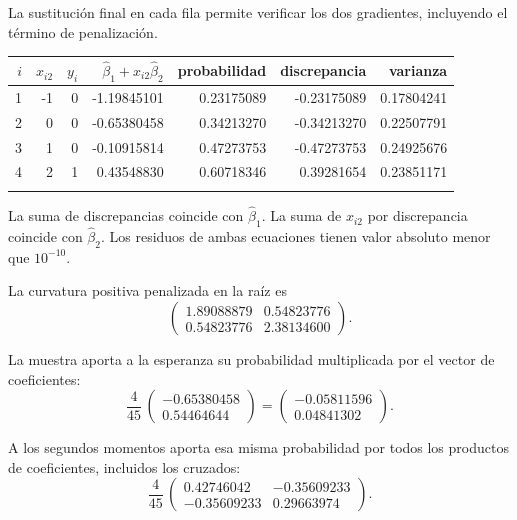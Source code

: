 \documentclass[11pt,a4paper]{article}
\begin{document}
La sustitución final en cada fila permite verificar
los dos gradientes, incluyendo el término de penalización.
\begin{center}\scriptsize
\begin{tabular}{rrrrrrr}\toprule
\(i\)&\(x_{i2}\)&\(y_i\)&\(\widehat\beta_1+x_{i2}\widehat\beta_2\)&probabilidad&discrepancia&varianza\\\midrule
1&-1&0&-1.19845101&0.23175089&-0.23175089&0.17804241\\
2&0&0&-0.65380458&0.34213270&-0.34213270&0.22507791\\
3&1&0&-0.10915814&0.47273753&-0.47273753&0.24925676\\
4&2&1&0.43548830&0.60718346&0.39281654&0.23851171\\
\\\bottomrule\end{tabular}\end{center}
La suma de discrepancias coincide con \(\widehat\beta_1\).
La suma de \(x_{i2}\) por discrepancia coincide con
\(\widehat\beta_2\). Los residuos de ambas ecuaciones
tienen valor absoluto menor que \(10^{-10}\).

La curvatura positiva penalizada en la raíz es
\[
\begin{pmatrix}1.89088879&0.54823776\\0.54823776&2.38134600\end{pmatrix}.
\]

La muestra aporta a la esperanza su probabilidad
multiplicada por el vector de coeficientes:
\[
\frac{4}{45}\,\begin{pmatrix}-0.65380458\\0.54464644\end{pmatrix}=\begin{pmatrix}-0.05811596\\0.04841302\end{pmatrix}.
\]

A los segundos momentos aporta esa misma probabilidad
por todos los productos de coeficientes, incluidos los cruzados:
\[
\frac{4}{45}\,\begin{pmatrix}0.42746042&-0.35609233\\-0.35609233&0.29663974\end{pmatrix}.
\]
\end{document}

